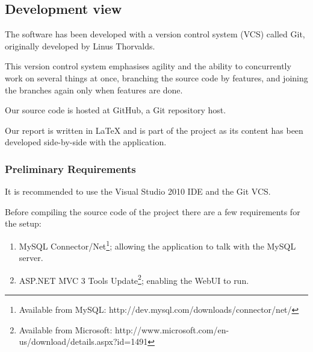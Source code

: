 \subsection{Development view}

The software has been developed with a version control system (VCS) called Git\cite{progit},
originally developed by Linus Thorvalds.

This version control system emphasises agility and the ability to concurrently work on several
things at once, branching the source code by features, and joining the branches again only when
features are done\cite{sopBranching}.

Our source code is hosted at GitHub, a Git repository host.

Our report is written in \LaTeX\cite{latexBook} and is part of the project as its content has been developed
side-by-side with the application.

\subsubsection{Preliminary Requirements}

It is recommended to use the Visual Studio 2010 IDE and the Git VCS.

Before compiling the source code of the project there are a few requirements for the setup:

\begin{enumerate}
    \item MySQL Connector/Net\footnote{Available from MySQL: http://dev.mysql.com/downloads/connector/net/};
        allowing the application to talk with the MySQL server.
    \item ASP.NET MVC 3 Tools Update\footnote{Available from Microsoft: http://www.microsoft.com/en-us/download/details.aspx?id=1491};
        enabling the WebUI to run.
\end{enumerate}
